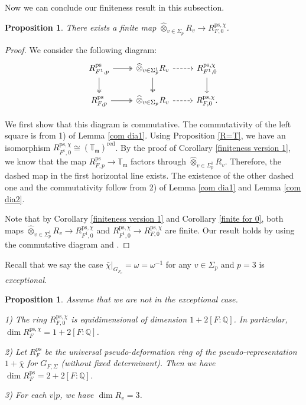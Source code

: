 \documentclass[a4paper, 12pt]{amsart}
\newtheorem{prop}[thm]{Proposition}
\def\ps{\mathrm{ps}}
\newcommand{\Q}{\mathbb{Q}}
\newcommand{\T}{\mathbb{T}}
\newcommand{\km}{\mathfrak{m}}
\begin{document}
    Now we can conclude our finiteness result in this subsection.
    
     \begin{prop}\label{finiteness 2}
    	There exists a finite map $\widehat{\otimes}_{v \in \Sigma_p} R_{v} \to R_{F, 0}^{\ps, \chi} $.
    \end{prop}
    
    \begin{proof}
    	We consider the following diagram:
    		\[\begin{tikzcd}
    		R_{F^1,p}^\ps  \arrow[r, two heads] \arrow[d, two heads]& \widehat{\otimes}_{v \in \Sigma^1_p} R_{v} \arrow[d, two heads]\arrow[r, dashed] & R_{F^1,0}^{\ps, \chi} \arrow[d] \\
    		R_{F,p}^\ps \arrow[r, two heads] & \widehat{\otimes}_{v \in \Sigma_p} R_{v} \arrow[r, dashed] & R_{F, 0}^{\ps, \chi}.
    	\end{tikzcd}\]
    	
    	We first show that this diagram is commutative. The commutativity of the left square is from 1) of Lemma \ref{com dia1}. Using Proposition \ref{R=T}, we have an isomorphism $R_{F^1,0}^{\ps, \chi} \cong (\T_\km)^{\operatorname{red}}$. By the proof of Corollary \ref{finiteness version 1}, we know that the map $R_{F,p}^\ps \to \T_\km$ factors through $\widehat{\otimes}_{v \in \Sigma_p^1} R_v$. Therefore, the dashed map in the first horizontal line exists. The existence of the other dashed one and the commutativity follow from 2) of Lemma \ref{com dia1} and Lemma \ref{com dia2}.
    	
    	Note that by Corollary \ref{finiteness version 1} and Corollary \ref{finite for 0}, both maps $\widehat{\otimes}_{v \in \Sigma^1_p} R_{v} \to R_{F^1, 0}^{\ps, \chi} $ and $R_{F^1,0}^{\ps, \chi} \to R_{F, 0}^{\ps, \chi} $ are finite. Our result holds by using the commutative diagram and \cite[Lemma 10.36.15]{stacks-project}.
    \end{proof}
    
    Recall that we say the case $ \bar{\chi}|_{G_{F_v}}=\omega=\omega^{-1}$ for any $v \in \Sigma_p$ and $p=3$ is \textit{exceptional}.
    
    \begin{prop}\label{finite same dim}
    	Assume that we are not in the exceptional case.
    	
    	1) The ring $R_{F, 0}^{\ps, \chi}$ is equidimensional of dimension $1+2[F:\Q]$. In particular, $\dim R_{F}^{\ps, \chi}=1+2[F:\Q]$.
    	
    	2) Let $R_{F}^{\ps}$ be the universal pseudo-deformation ring of the pseudo-representation $1+\bar{\chi}$ for $G_{F, \Sigma}$ (without fixed determinant). Then we have $\dim R_{F}^{\ps}=2+2[F:\Q]$.
    	
    	3) For each $v|p$, we have $\dim R_v=3$.
    \end{prop}
    
\end{document}
